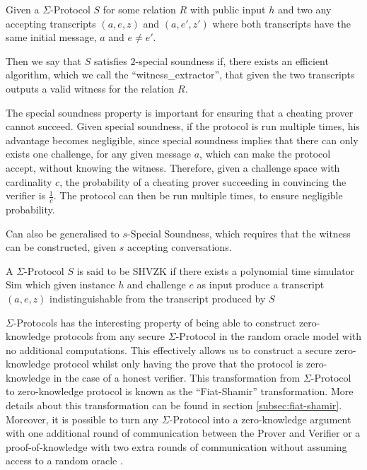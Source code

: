 \begin{definition}
Given a $\Sigma$-Protocol $S$ for some relation $R$ with public input $h$
and two any accepting transcripts $(a,e,z)$ and $(a,e',z')$
where both transcripts have the same initial message, $a$ and $e \neq e'$.

Then we say that $S$ satisfies $2$-special soundness if, there exists an
efficient algorithm, which we call the ``witness\_extractor'',
that given the two transcripts outputs a valid witness for the relation $R$.
\end{definition}

The special soundness property is important for ensuring that a cheating prover
cannot succeed. Given special soundness, if the protocol is run multiple times,
his advantage becomes negligible, since special soundness implies that there can
only exists one challenge, for any given message $a$, which can make the
protocol accept, without knowing the witness. Therefore, given a challenge space
with cardinality $c$, the probability of a cheating prover succeeding in
convincing the verifier is $\frac{1}{c}$. The protocol can then be run multiple
times, to ensure negligible probability.

Can also be generalised to $s$-Special Soundness, which requires that the
witness can be constructed, given $s$ accepting conversations.

\begin{definition}[SHVZK]
  A $\Sigma$-Protocol $S$ is said to be SHVZK if there exists a polynomial time
  simulator Sim which given instance $h$ and challenge $e$ as input produce a
  transcript $(a,e,z)$ indistinguishable from the transcript produced by $S$
\end{definition}

$\Sigma$-Protocols has the interesting property of being able to construct
zero-knowledge protocols from any secure $\Sigma$-Protocol in the random oracle
model with no additional computations. This effectively allows us to construct a
secure zero-knowledge protocol whilst only having the prove that the protocol is
zero-knowledge in the case of a honest verifier. This transformation from
$\Sigma$-Protocol to zero-knowledge protocol is known as the ``Fiat-Shamir''
transformation. More details about this transformation can be found in section
\ref{subsec:fiat-shamir}.
Moreover, it is possible to turn any $\Sigma$-Protocol into a zero-knowledge
argument with one additional round of communication between the Prover and
Verifier or a proof-of-knowledge with two extra rounds of communication without
assuming access to a random oracle \cite{on-sigma-protocols}.


